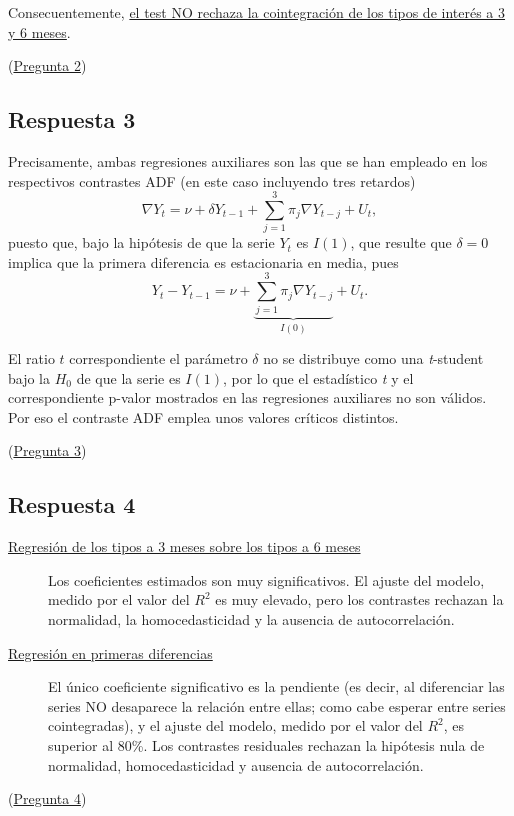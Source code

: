 \documentclass[10pt]{article}
\begin{document}
Consecuentemente, \uline{el test NO rechaza la cointegración de los tipos de
interés a 3 y 6 meses}.

(\hyperref[sec:org0e98855]{Pregunta 2})
\subsection*{Respuesta 3}
\label{sec:orga8eeeb5}

Precisamente, ambas regresiones auxiliares son las que se han empleado
en los respectivos contrastes ADF (en este caso incluyendo tres
retardos) $$\nabla Y_{t} = \nu + \delta Y_{t-1} + \sum_{j=1}^3 \pi_j
\nabla Y_{t-j} + U_t,$$ puesto que, bajo la hipótesis de que la serie
\(Y_t\) es \(I(1)\), que resulte que \(\delta=0\) implica que la primera
diferencia es estacionaria en media, pues $$Y_{t}-Y_{t-1} = \nu +
\underbrace{\sum_{j=1}^3 \pi_j \nabla Y_{t-j}}_{I(0)} + U_t.$$

El ratio \(t\) correspondiente el parámetro \(\delta\) no se distribuye
como una \emph{t}-student bajo la \(H_0\) de que la serie es \(I(1)\), por lo
que el estadístico \emph{t} y el correspondiente p-valor mostrados en las
regresiones auxiliares no son válidos. Por eso el contraste ADF emplea
unos valores críticos distintos.

(\hyperref[sec:org4bd3e2c]{Pregunta 3})
\subsection*{Respuesta 4}
\label{sec:orgafbf074}

\begin{description}
\item[{\hyperref[sec:org39fba0c]{Regresión de los tipos a 3 meses sobre los tipos a 6 meses}}] Los
coeficientes estimados son muy significativos. El ajuste del modelo,
medido por el valor del \(R^2\) es muy elevado, pero los contrastes
rechazan la normalidad, la homocedasticidad y la ausencia de
autocorrelación.

\item[{\hyperref[sec:org4caec88]{Regresión en primeras diferencias}}] El único coeficiente
significativo es la pendiente (es decir, al diferenciar las series
NO desaparece la relación entre ellas; como cabe esperar entre
series cointegradas), y el ajuste del modelo, medido por el valor
del \(R^2\), es superior al 80\%. Los contrastes residuales rechazan
la hipótesis nula de normalidad, homocedasticidad y ausencia de
autocorrelación.
\end{description}

(\hyperref[sec:org8c9c8da]{Pregunta 4})
\end{document}
